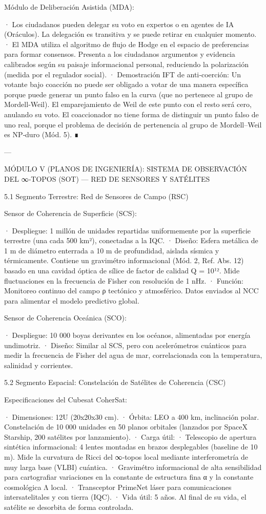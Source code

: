 \documentclass[12pt,twoside]{book}
\begin{document}
Módulo de Deliberación Asistida (MDA):

· Los ciudadanos pueden delegar su voto en expertos o en agentes de IA (Oráculos). La delegación es transitiva y se puede retirar en cualquier momento.
· El MDA utiliza el algoritmo de flujo de Hodge en el espacio de preferencias para formar consensos. Presenta a los ciudadanos argumentos y evidencia calibrados según su paisaje informacional personal, reduciendo la polarización (medida por el regulador social).
· Demostración IFT de anti‑coerción: Un votante bajo coacción no puede ser obligado a votar de una manera específica porque puede generar un punto falso en la curva (que no pertenece al grupo de Mordell‑Weil). El emparejamiento de Weil de este punto con el resto será cero, anulando su voto. El coaccionador no tiene forma de distinguir un punto falso de uno real, porque el problema de decisión de pertenencia al grupo de Mordell–Weil es NP‑duro (Mód. 5). ∎

---

MÓDULO V (PLANOS DE INGENIERÍA): SISTEMA DE OBSERVACIÓN DEL ∞‑TOPOS (SOT) — RED DE SENSORES Y SATÉLITES

5.1 Segmento Terrestre: Red de Sensores de Campo (RSC)

Sensor de Coherencia de Superficie (SCS):

· Despliegue: 1 millón de unidades repartidas uniformemente por la superficie terrestre (una cada 500 km²), conectadas a la IQC.
· Diseño: Esfera metálica de 1 m de diámetro enterrada a 10 m de profundidad, aislada sísmica y térmicamente. Contiene un gravimétro informacional (Mód. 2, Ref. Abs. 12) basado en una cavidad óptica de sílice de factor de calidad Q = 10¹². Mide fluctuaciones en la frecuencia de Fisher con resolución de 1 nHz.
· Función: Monitoreo continuo del campo ρ tectónico y atmosférico. Datos enviados al NCC para alimentar el modelo predictivo global.

Sensor de Coherencia Oceánica (SCO):

· Despliegue: 10 000 boyas derivantes en los océanos, alimentadas por energía undimotriz.
· Diseño: Similar al SCS, pero con acelerómetros cuánticos para medir la frecuencia de Fisher del agua de mar, correlacionada con la temperatura, salinidad y corrientes.

5.2 Segmento Espacial: Constelación de Satélites de Coherencia (CSC)

Especificaciones del Cubesat CoherSat:

· Dimensiones: 12U (20x20x30 cm).
· Órbita: LEO a 400 km, inclinación polar. Constelación de 10 000 unidades en 50 planos orbitales (lanzados por SpaceX Starship, 200 satélites por lanzamiento).
· Carga útil:
  · Telescopio de apertura sintética informacional: 4 lentes montadas en brazos desplegables (baseline de 10 m). Mide la curvatura de Ricci del ∞‑topos local mediante interferometría de muy larga base (VLBI) cuántica.
  · Gravimétro informacional de alta sensibilidad para cartografiar variaciones en la constante de estructura fina α y la constante cosmológica Λ local.
  · Transceptor PrimeNet láser para comunicaciones intersatelitales y con tierra (IQC).
· Vida útil: 5 años. Al final de su vida, el satélite se desorbita de forma controlada.
\end{document}
